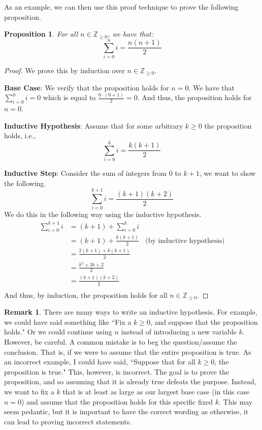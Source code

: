 \documentclass{article}
\newcommand{\ZZ}{\mathbb{Z}_{\geq 0}}
\theoremstyle{plain}
\newtheorem{proposition}{Proposition}
\theoremstyle{definition}
\newtheorem{remark}{Remark}
\begin{document}
As an example, we can then use this proof technique to prove the following proposition.

\begin{proposition}\label{prop1}
    For all \(n \in \ZZ\), we have that:
    \[\sum_{i=0}^n i = \frac{n(n+1)}{2}\]
\end{proposition}
\begin{proof}
    We prove this by induction over \(n \in \ZZ\).
    
    \textbf{Base Case}: We verify that the proposition holds for \(n=0\). We have that \(\sum_{i=0}^0 i = 0\) which is equal to \(\frac{0 \cdot (0 + 1)}{2} = 0\). And thus, the proposition holds for \(n=0\).

    \textbf{Inductive Hypothesis}: Assume that for some arbitrary \(k \geq 0\) the proposition holds, i.e.,
    \[\sum_{i=0}^k i = \frac{k(k+1)}{2}\]

    \textbf{Inductive Step}: Consider the sum of integers from \(0\) to \(k+1\), we want to show the following.
    \[\sum_{i=0}^{k+1} i = \frac{(k+1)(k+2)}{2}\]
    We do this in the following way using the inductive hypothesis.
    \begin{align*}
        \sum_{i=0}^{k+1} i &= (k+1) + \sum_{i = 0}^{k} i \\
        &= (k+1) + \frac{k(k+1)}{2}\ \ \ \ \text{(by inductive hypothesis)} \\
        &= \frac{2(k+1) + k(k+1)}{2} \\
        &= \frac{k^2 + 3k + 2}{2} \\ 
        &= \frac{(k+1)(k+2)}{2} \\ 
    \end{align*}
    And thus, by induction, the proposition holds for all \(n \in \ZZ\).
\end{proof}

\begin{remark}
    There are many ways to write an inductive hypothesis. For example, we could have said something like ``Fix a \(k \geq 0\), and suppose that the proposition holds." Or we could continue using \(n\) instead of introducing a new variable \(k\). However, be careful. A common mistake is to beg the question/assume the conclusion. That is, if we were to assume that the entire proposition is true. As an incorrect example, I could have said, ``Suppose that for all \(k \geq 0\), the proposition is true." This, however, is incorrect. The goal is to prove the proposition, and so assuming that it is already true defeats the purpose. Instead, we want to fix a \(k\) that is at least as large as our largest base case (in this case \(n=0\)) and assume that the proposition holds for this specific fixed \(k\). This may seem pedantic, but it is important to have the correct wording as otherwise, it can lead to proving incorrect statements.
\end{remark}
\end{document}
